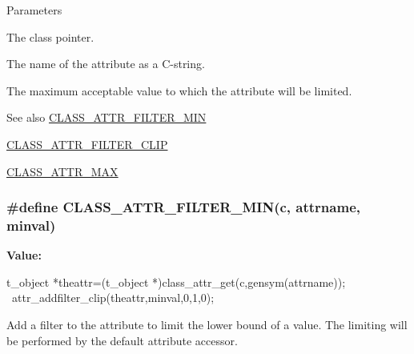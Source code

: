 \begin{DoxyParams}{Parameters}
\item[{\em c}]The class pointer. \item[{\em attrname}]The name of the attribute as a C-\/string. \item[{\em maxval}]The maximum acceptable value to which the attribute will be limited. \end{DoxyParams}
\begin{DoxySeeAlso}{See also}
\hyperlink{group__attr_gae7e3e18443e45adab1b5330ce2492a76}{CLASS\_\-ATTR\_\-FILTER\_\-MIN} 

\hyperlink{group__attr_ga7a9fa82b3419df8a770830fb34df39b0}{CLASS\_\-ATTR\_\-FILTER\_\-CLIP} 

\hyperlink{group__attr_ga80157be7023be017f33e5c80b6f845d6}{CLASS\_\-ATTR\_\-MAX} 
\end{DoxySeeAlso}
\hypertarget{group__attr_gae7e3e18443e45adab1b5330ce2492a76}{
\subsubsection[{CLASS\_\-ATTR\_\-FILTER\_\-MIN}]{\setlength{\rightskip}{0pt plus 5cm}\#define CLASS\_\-ATTR\_\-FILTER\_\-MIN(c, \/  attrname, \/  minval)}}
\label{group__attr_gae7e3e18443e45adab1b5330ce2492a76}
{\bfseries Value:}
\begin{DoxyCode}
{ t_object *theattr=(t_object *)class_attr_get(c,gensym(attrname)); \
        attr_addfilter_clip(theattr,minval,0,1,0); }
\end{DoxyCode}


Add a filter to the attribute to limit the lower bound of a value. The limiting will be performed by the default attribute accessor.


